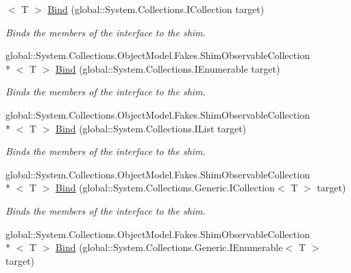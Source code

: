 \begin{DoxyCompactItemize}
$<$ T $>$ \hyperlink{class_system_1_1_collections_1_1_object_model_1_1_fakes_1_1_shim_observable_collection_3_01_t_01_4_a71b815ae885150701e542972c550066c}{Bind} (global\-::\-System.\-Collections.\-I\-Collection target)
\begin{DoxyCompactList}\small\item\em Binds the members of the interface to the shim.\end{DoxyCompactList}\item 
global\-::\-System.\-Collections.\-Object\-Model.\-Fakes.\-Shim\-Observable\-Collection\\*
$<$ T $>$ \hyperlink{class_system_1_1_collections_1_1_object_model_1_1_fakes_1_1_shim_observable_collection_3_01_t_01_4_a642c8ce5388ee036fc2c2aeb006c4bf6}{Bind} (global\-::\-System.\-Collections.\-I\-Enumerable target)
\begin{DoxyCompactList}\small\item\em Binds the members of the interface to the shim.\end{DoxyCompactList}\item 
global\-::\-System.\-Collections.\-Object\-Model.\-Fakes.\-Shim\-Observable\-Collection\\*
$<$ T $>$ \hyperlink{class_system_1_1_collections_1_1_object_model_1_1_fakes_1_1_shim_observable_collection_3_01_t_01_4_affb4acbf18ce9118584b25a0b1e09923}{Bind} (global\-::\-System.\-Collections.\-I\-List target)
\begin{DoxyCompactList}\small\item\em Binds the members of the interface to the shim.\end{DoxyCompactList}\item 
global\-::\-System.\-Collections.\-Object\-Model.\-Fakes.\-Shim\-Observable\-Collection\\*
$<$ T $>$ \hyperlink{class_system_1_1_collections_1_1_object_model_1_1_fakes_1_1_shim_observable_collection_3_01_t_01_4_a9f836106e8ee1da73224e8ef88a6d791}{Bind} (global\-::\-System.\-Collections.\-Generic.\-I\-Collection$<$ T $>$ target)
\begin{DoxyCompactList}\small\item\em Binds the members of the interface to the shim.\end{DoxyCompactList}\item 
global\-::\-System.\-Collections.\-Object\-Model.\-Fakes.\-Shim\-Observable\-Collection\\*
$<$ T $>$ \hyperlink{class_system_1_1_collections_1_1_object_model_1_1_fakes_1_1_shim_observable_collection_3_01_t_01_4_a567f26f5cc26b2485a26faa1c5725bc9}{Bind} (global\-::\-System.\-Collections.\-Generic.\-I\-Enumerable$<$ T $>$ target)

\end{DoxyCompactItemize}
